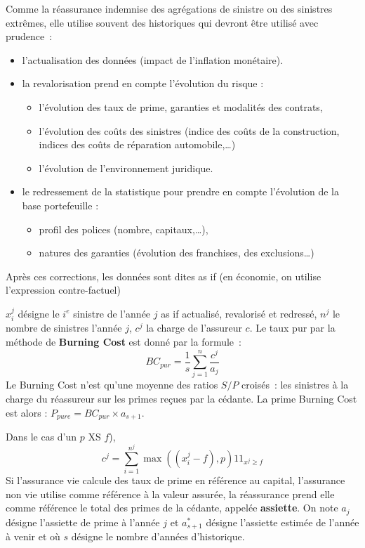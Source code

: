 \begin{f}
	[Les données en réassurance ]

Comme la réassurance indemnise des agrégations de sinistre ou des sinistres extrêmes, elle utilise souvent des historiques qui devront être utilisé avec prudence~:
\begin{itemize}
	\item l'actualisation des données (impact de l'inflation monétaire).
	\item la revalorisation prend en compte l'évolution du risque :
	\begin{itemize}
		\item l'évolution des taux de prime, garanties et modalités des contrats,
		\item l'évolution des coûts des sinistres (indice des coûts de la construction, indices des coûts de réparation automobile,\ldots)
		\item l'évolution de l'environnement juridique.
	\end{itemize}
	\item le redressement de la statistique pour prendre en compte l'évolution de la base  portefeuille :
	\begin{itemize}
		\item profil des polices (nombre, capitaux,\ldots),
		\item natures des garanties (évolution des franchises, des exclusions\ldots)
	\end{itemize}
\end{itemize}
Après ces corrections, les données sont dites \og as if \fg (en économie, on utilise l'expression contre-factuel)

\end{f}


\begin{f}
	
	$x_{i}^{j}$ désigne le $i^{e}$ sinistre  de l'année $j$ \og{}as if\fg{} actualisé, revalorisé et  redressé,
$n^j$ le nombre de sinistres l'année $j$, $c^{j}$ la charge de l'assureur $c$.
Le taux pur  par la méthode de \textbf{Burning Cost} est donné par la formule~:
$$
BC_{pur}=\frac{1}{s}\sum_{j=1}^{n}\frac{c^{j}}{a_{j}}
$$ 
Le Burning Cost n'est qu'une moyenne des ratios $S/P$ croisés~: les sinistres à la charge du réassureur sur les primes reçues par la cédante.
La prime Burning Cost est alors : $P_{pure}=BC_{pur}\times a_{s+1}$.

Dans le cas d'un $p$ XS $f$), $$
c^{j}=\sum_{i=1}^{n^j}\max\left(  \left( x_{i}^{j}-f\right),p\right) 1\!\!1_{x^{j}\geq f}
$$
Si l'assurance vie calcule des taux de prime en référence au capital, l'assurance non vie utilise comme  référence à la valeur assurée, la réassurance prend elle comme référence le total des primes de la cédante, appelée \textbf{assiette}.
On note $a_{j}$ désigne l'assiette de prime à l'année $j$ et $a_{s+1}^{*}$ désigne l'assiette estimée de l'année à venir et où $s$ désigne le nombre d'années d'historique.
\end{f}



